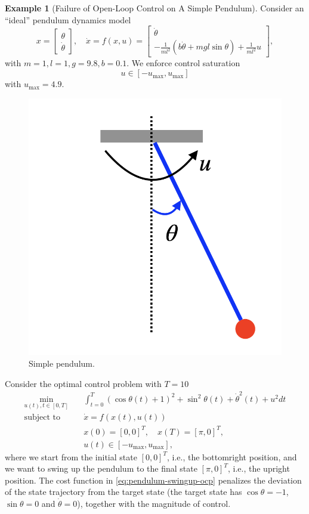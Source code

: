 \documentclass[
]{book}
\theoremstyle{definition}
\theoremstyle{definition}
\newtheorem{example}{Example}[chapter]
\theoremstyle{definition}
\theoremstyle{definition}
\theoremstyle{remark}
\begin{document}
\begin{example}[Failure of Open-Loop Control on A Simple Pendulum]
\protect\hypertarget{exm:pendulum-collocation-failure}{}\label{exm:pendulum-collocation-failure}Consider an ``ideal'' pendulum dynamics model
\[
x = \begin{bmatrix} \theta \\ \dot{\theta} \end{bmatrix}, \quad \dot{x} = f(x,u) = \begin{bmatrix} \dot{\theta} \\ - \frac{1}{ml^2} (b \dot{\theta} + mgl \sin \theta) + \frac{1}{ml^2} u \end{bmatrix},
\]
with \(m=1,l=1,g=9.8,b=0.1\). We enforce control saturation
\[
u \in [-u_{\max}, u_{\max}]
\]
with \(u_{\max} = 4.9\).

\begin{figure}

{\centering \includegraphics[width=0.4\linewidth]{images/pendulum-drawing} 

}

\caption{Simple pendulum.}\label{fig:pendulum-model-failure}
\end{figure}

Consider the optimal control problem with \(T=10\)
\begin{equation}
\begin{split} \min_{u(t), t \in [0,T]} & \quad \int_{t=0}^T (\cos \theta(t) + 1)^2 + \sin^2\theta(t) + \dot{\theta}^2(t) + u^2 dt \\
\text{subject to} & \quad \dot{x} = f(x(t),u(t)) \\
& \quad x(0) = [0,0]^T, \quad x(T) = [\pi,0]^T, \\
& \quad u(t) \in [-u_{\max},u_{\max}],
\end{split}
\label{eq:pendulum-swingup-ocp}
\end{equation}
where we start from the initial state \([0,0]^T\), i.e., the bottomright position, and we want to swing up the pendulum to the final state \([\pi,0]^T\), i.e., the upright position. The cost function in \eqref{eq:pendulum-swingup-ocp} penalizes the deviation of the state trajectory from the target state (the target state has \(\cos \theta = -1\), \(\sin \theta = 0\) and \(\dot{\theta} = 0\)), together with the magnitude of control.


\end{example}
\end{document}
